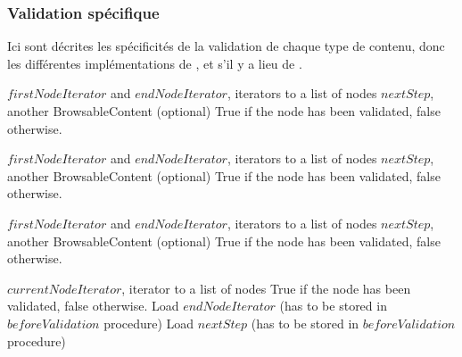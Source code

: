 \subsubsection{Validation spécifique}
\label{valid_spec}
Ici sont décrites les spécificités de la validation de chaque type de contenu, donc les différentes implémentations de , et s'il y a lieu de .

\begin{algorithm}[H]
\caption{}
\begin{algorithmic}
\REQUIRE $firstNodeIterator$ and $endNodeIterator$, iterators to a list of nodes
\REQUIRE $nextStep$, another BrowsableContent (optional)
\ENSURE True if the node has been validated, false otherwise.
\RETURN \browseUp
\ELSE
\RETURN \FALSE
\ENDIF
\end{algorithmic}
\end{algorithm}

\begin{algorithm}[H]
\caption{}
\begin{algorithmic}
\REQUIRE $firstNodeIterator$ and $endNodeIterator$, iterators to a list of nodes
\REQUIRE $nextStep$, another BrowsableContent (optional)
\ENSURE True if the node has been validated, false otherwise.
\RETURN \FALSE
\ELSE
{}
\RETURN \browseUp
\ELSE
\RETURN \FALSE
\ENDIF
\ENDIF
\end{algorithmic}
\end{algorithm}

\begin{algorithm}[H]
\caption{}
\begin{algorithmic}
\REQUIRE $firstNodeIterator$ and $endNodeIterator$, iterators to a list of nodes
\REQUIRE $nextStep$, another BrowsableContent (optional)
\ENSURE True if the node has been validated, false otherwise.
\STATE \browseDown
\ENDWHILE
{}
\RETURN \TRUE
\ELSE
\RETURN \FALSE
\ENDIF
\end{algorithmic}
\end{algorithm}

\begin{algorithm}[H]
\caption{}
\begin{algorithmic}
\REQUIRE $currentNodeIterator$, iterator to a list of nodes
\ENSURE True if the node has been validated, false otherwise.
\STATE Load $endNodeIterator$ (has to be stored in $beforeValidation$ procedure)
\STATE Load $nextStep$ (has to be stored in $beforeValidation$ procedure)
\RETURN \browseUp
\end{algorithmic}
\end{algorithm}

